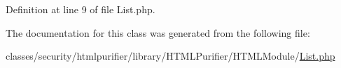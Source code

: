 Definition at line 9 of file List.\+php.



The documentation for this class was generated from the following file\+:\begin{DoxyCompactItemize}
\item 
classes/security/htmlpurifier/library/\+H\+T\+M\+L\+Purifier/\+H\+T\+M\+L\+Module/\hyperlink{HTMLModule_2List_8php}{List.\+php}\end{DoxyCompactItemize}

